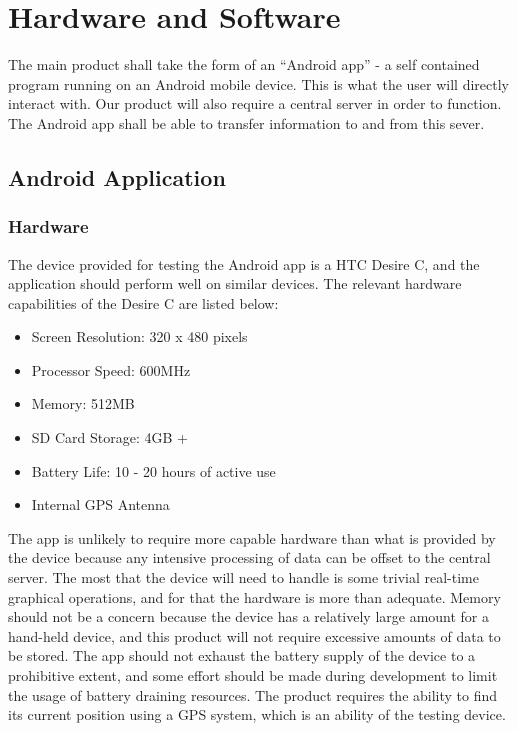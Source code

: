 \section{Hardware and Software}
	The main product shall take the form of an ``Android app'' - a self 
	contained program running on an Android mobile device. This is what the 
	user will directly interact with. Our product will also require a central 
	server in order to function. The Android app shall be able to transfer 
	information to and from this sever.
	\subsection{Android Application}
		\subsubsection{Hardware}
			The device provided for testing the Android app is a HTC Desire C, 
			and the application should perform well on similar devices. The 
			relevant hardware capabilities of the Desire C are listed
			below\cite{htcdesirex}:

			\begin{itemize}
				\item Screen Resolution: 320 x 480 pixels
				\item Processor Speed: 600MHz
				\item Memory: 512MB
				\item SD Card Storage: 4GB +
				\item Battery Life: 10 - 20 hours of active use
				\item Internal GPS Antenna
			\end{itemize}

			\noindent
			The app is unlikely to require more capable hardware than what is 
			provided by the device because any intensive processing of data 
			can be offset to the central server. The most that the device will 
			need to handle is some trivial real-time graphical operations, and 
			for that the hardware is more than adequate. Memory should not be 
			a concern because the device has a relatively large amount for a 
			hand-held device, and this product will not require excessive 
			amounts of data to be stored. The app should not exhaust the 
			battery supply of the device to a prohibitive extent, and some 
			effort should be made during development to limit the usage of 
			battery draining resources. The product requires the ability to 
			find its current position using a GPS system, which is an ability 
			of the testing device.
